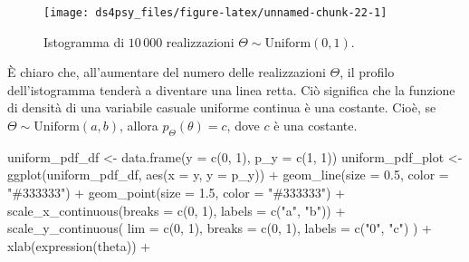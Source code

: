 \documentclass[
  11pt,
]{krantz}
\makeatletter
\newenvironment{Shaded}{\begin{snugshade}}{\end{snugshade}}
\newcommand{\AttributeTok}[1]{\textcolor[rgb]{0.61,0.61,0.61}{#1}}
\newcommand{\DecValTok}[1]{\textcolor[rgb]{0.06,0.06,0.06}{#1}}
\newcommand{\FloatTok}[1]{\textcolor[rgb]{0.06,0.06,0.06}{#1}}
\newcommand{\FunctionTok}[1]{\textcolor[rgb]{0,0,0}{#1}}
\newcommand{\NormalTok}[1]{#1}
\newcommand{\OtherTok}[1]{\textcolor[rgb]{0.37,0.37,0.37}{#1}}
\newcommand{\SpecialCharTok}[1]{\textcolor[rgb]{0,0,0}{#1}}
\newcommand{\StringTok}[1]{\textcolor[rgb]{0.5,0.5,0.5}{#1}}
\newenvironment{kframe}{%
\medskip{}
\setlength{\fboxsep}{.8em}
 \def\at@end@of@kframe{}%
 \ifinner\ifhmode%
  \def\at@end@of@kframe{\end{minipage}}%
  \begin{minipage}{\columnwidth}%
 \fi\fi%
 \def\FrameCommand##1{\hskip\@totalleftmargin \hskip-\fboxsep
 \colorbox{shadecolor}{##1}\hskip-\fboxsep
     \hskip-\linewidth \hskip-\@totalleftmargin \hskip\columnwidth}%
 \MakeFramed {\advance\hsize-\width
   \@totalleftmargin\z@ \linewidth\hsize
   \@setminipage}}%
 {\par\unskip\endMakeFramed%
 \at@end@of@kframe}
\renewenvironment{Shaded}{\begin{kframe}}{\end{kframe}}
\theoremstyle{definition}
\theoremstyle{definition}
\theoremstyle{definition}
\theoremstyle{definition}
\theoremstyle{remark}
\makeatother
\begin{document}
\begin{figure}

{\centering \texttt{[image: ds4psy\_files/figure-latex/unnamed-chunk-22-1]} 

}

\caption{Istogramma di $10\,000$ realizzazioni $\Theta \sim \mbox{Uniform}(0, 1)$. }\label{fig:unnamed-chunk-22}
\end{figure}

È chiaro che, all'aumentare del numero delle realizzazioni \(\Theta\), il profilo dell'istogramma tenderà a diventare una linea retta. Ciò significa che la funzione di densità di una variabile casuale uniforme continua è una costante. Cioè, se \(\Theta \sim \mbox{Uniform} (a, b)\), allora \(p_{\Theta}(\theta) = c\), dove \(c\) è una costante.

\begin{Shaded}
\begin{Highlighting}[]
\NormalTok{uniform\_pdf\_df }\OtherTok{\textless{}{-}} \FunctionTok{data.frame}\NormalTok{(}\AttributeTok{y =} \FunctionTok{c}\NormalTok{(}\DecValTok{0}\NormalTok{, }\DecValTok{1}\NormalTok{), }\AttributeTok{p\_y =} \FunctionTok{c}\NormalTok{(}\DecValTok{1}\NormalTok{, }\DecValTok{1}\NormalTok{))}
\NormalTok{uniform\_pdf\_plot }\OtherTok{\textless{}{-}}
  \FunctionTok{ggplot}\NormalTok{(uniform\_pdf\_df, }\FunctionTok{aes}\NormalTok{(}\AttributeTok{x =}\NormalTok{ y, }\AttributeTok{y =}\NormalTok{ p\_y)) }\SpecialCharTok{+}
  \FunctionTok{geom\_line}\NormalTok{(}\AttributeTok{size =} \FloatTok{0.5}\NormalTok{, }\AttributeTok{color =} \StringTok{"\#333333"}\NormalTok{) }\SpecialCharTok{+}
  \FunctionTok{geom\_point}\NormalTok{(}\AttributeTok{size =} \FloatTok{1.5}\NormalTok{, }\AttributeTok{color =} \StringTok{"\#333333"}\NormalTok{) }\SpecialCharTok{+}
  \FunctionTok{scale\_x\_continuous}\NormalTok{(}\AttributeTok{breaks =} \FunctionTok{c}\NormalTok{(}\DecValTok{0}\NormalTok{, }\DecValTok{1}\NormalTok{), }\AttributeTok{labels =} \FunctionTok{c}\NormalTok{(}\StringTok{"a"}\NormalTok{, }\StringTok{"b"}\NormalTok{)) }\SpecialCharTok{+}
  \FunctionTok{scale\_y\_continuous}\NormalTok{(}
    \AttributeTok{lim =} \FunctionTok{c}\NormalTok{(}\DecValTok{0}\NormalTok{, }\DecValTok{1}\NormalTok{), }\AttributeTok{breaks =} \FunctionTok{c}\NormalTok{(}\DecValTok{0}\NormalTok{, }\DecValTok{1}\NormalTok{),}
    \AttributeTok{labels =} \FunctionTok{c}\NormalTok{(}\StringTok{"0"}\NormalTok{, }\StringTok{"c"}\NormalTok{)}
\NormalTok{  ) }\SpecialCharTok{+}
  \FunctionTok{xlab}\NormalTok{(}\FunctionTok{expression}\NormalTok{(theta)) }\SpecialCharTok{+}

\end{Highlighting}
\end{Shaded}
\end{document}
